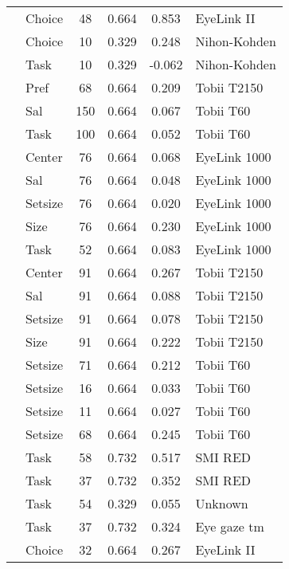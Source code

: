 \begin{longtable}{p{8cm}lcccl}
  \cite{mitsuda2014} & Choice & 48 & 0.664 & 0.853 & EyeLink II \\ 
  \cite{nittono2009} & Choice & 10 & 0.329 & 0.248 & Nihon-Kohden \\ 
  \cite{nittono2009} & Task & 10 & 0.329 & -0.062 & Nihon-Kohden \\ 
  \cite{orquin2013} & Pref & 68 & 0.664 & 0.209 & Tobii T2150 \\ 
  \cite{orquin2015a} & Sal & 150 & 0.664 & 0.067 & Tobii T60 \\ 
  \cite{orquin2015a} & Task & 100 & 0.664 & 0.052 & Tobii T60 \\ 
  \cite{orquin2019a} & Center & 76 & 0.664 & 0.068 & EyeLink 1000 \\ 
  \cite{orquin2019a} & Sal & 76 & 0.664 & 0.048 & EyeLink 1000 \\ 
  \cite{orquin2019a} & Setsize & 76 & 0.664 & 0.020 & EyeLink 1000 \\ 
  \cite{orquin2019a} & Size & 76 & 0.664 & 0.230 & EyeLink 1000 \\ 
  \cite{orquin2019a} & Task & 52 & 0.664 & 0.083 & EyeLink 1000 \\ 
  \cite{orquin2019a} & Center & 91 & 0.664 & 0.267 & Tobii T2150 \\ 
  \cite{orquin2019a} & Sal & 91 & 0.664 & 0.088 & Tobii T2150 \\ 
  \cite{orquin2019a} & Setsize & 91 & 0.664 & 0.078 & Tobii T2150 \\ 
  \cite{orquin2019a} & Size & 91 & 0.664 & 0.222 & Tobii T2150 \\ 
  \cite{orquin2020osfb} & Setsize & 71 & 0.664 & 0.212 & Tobii T60 \\ 
  \cite{orquin2020osfb} & Setsize & 16 & 0.664 & 0.033 & Tobii T60 \\ 
  \cite{orquin2020osfb} & Setsize & 11 & 0.664 & 0.027 & Tobii T60 \\ 
  \cite{orquin2020osfb} & Setsize & 68 & 0.664 & 0.245 & Tobii T60 \\ 
  \cite{paernamets2015a} & Task & 58 & 0.732 & 0.517 & SMI RED \\ 
  \cite{paernamets2015a} & Task & 37 & 0.732 & 0.352 & SMI RED \\ 
  \cite{pieters1999} & Task & 54 & 0.329 & 0.055 & Unknown \\ 
  \cite{rubaltelli2012} & Task & 37 & 0.732 & 0.324 & Eye gaze tm \\ 
  \cite{schotter2010a} & Choice & 32 & 0.664 & 0.267 & EyeLink II \\ 

\end{longtable}
